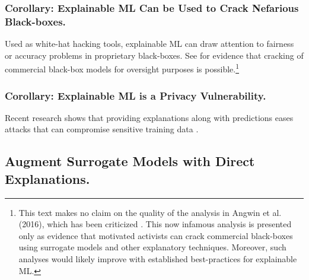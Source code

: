 \documentclass[sigconf]{acmart}
\begin{document}
\subsubsection{Corollary: Explainable ML Can be Used to Crack Nefarious Black-boxes.} Used as white-hat hacking tools, explainable ML can draw attention to fairness or accuracy problems in proprietary black-boxes. See \citet{angwin16} for evidence that cracking of commercial black-box models for oversight purposes is possible.\footnote{This text makes no claim on the quality of the analysis in Angwin et al. (2016), which has been criticized \cite{flores2016false}. This now infamous analysis is presented only as evidence that motivated activists can crack commercial black-boxes using surrogate models and other explanatory techniques. Moreover, such analyses would likely improve with established best-practices for explainable ML.} 

\subsubsection{Corollary: Explainable ML is a Privacy Vulnerability.} Recent research shows that providing explanations along with predictions eases attacks that can compromise sensitive training data \cite{shokri2019privacy}. 

\subsection{Augment Surrogate Models with Direct Explanations.} \label{sec:surrogate}
\end{document}
